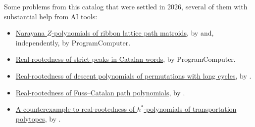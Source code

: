 Some problems from this catalog that were settled in 2026, several of them
with substantial help from AI tools:
\begin{itemize}
\item \hyperref[conjRibbonMatroidZ]{Narayana $Z$-polynomials of ribbon
lattice path matroids}, by  and, independently, by
ProgramComputer.
\item \hyperref[catalanWordPeaksRealRooted]{Real-rootedness of strict peaks
in Catalan words}, by ProgramComputer.
\item \hyperref[conjLongCycleDescents]{Real-rootedness of descent
polynomials of permutations with long cycles}, by .
\item \hyperref[fussCatalanNNERealRooted]{Real-rootedness of Fuss--Catalan
path polynomials}, by .
\item \hyperref[conjTransportationHStar]{A counterexample to real-rootedness
of $h^*$-polynomials of transportation polytopes}, by .
\end{itemize}
